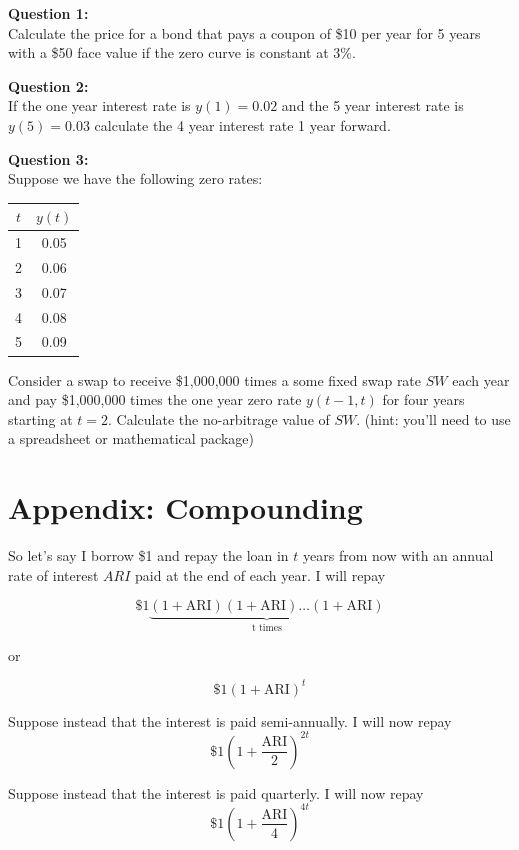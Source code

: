 \textbf{Question 1:}\\
Calculate the price for a bond that pays a coupon of \$10 per year for 5 years with a \$50 face value if the zero curve is constant at 3\%.

\textbf{Question 2:}\\
If the one year interest rate is $y(1) = 0.02$ and the 5 year interest rate is $y(5) = 0.03$ calculate the 4 year interest rate 1 year forward.

\textbf{Question 3:}\\
Suppose we have the following zero rates:\\
\begin{center}
\begin{tabular}{|c|c|}
  \hline
  $t$ & $y(t)$ \\
  \hline
  1&0.05 \\
  2&0.06 \\
  3&0.07 \\
  4&0.08 \\
  5&0.09\\
  \hline
\end{tabular}
\end{center}


Consider a swap to receive \$1,000,000 times a some fixed swap rate $SW$ each year and pay \$1,000,000 times the one year zero rate $y(t-1,t)$ for four years starting at $t=2$. Calculate the no-arbitrage value of $SW$. (hint: you'll need to use a spreadsheet or mathematical package)



\section*{Appendix: Compounding}


So let's say I borrow \$1 and repay the loan in $t$ years from now with an annual rate of interest $ARI$ paid at the end of each year. I will repay

\[ \$1\underbrace{\left(1+\mbox{ARI}\right)\left(1+\mbox{ARI}\right)\ldots\left(1+\mbox{ARI}\right)}_{\mbox{t times}} \]


or

 \[\$1\left(1+\mbox{ARI}\right)^t \]

Suppose instead that the interest is paid semi-annually. I will now repay \[\$1\left(1+\frac{\mbox{ARI}}{2}\right)^{2t} \]

Suppose instead that the interest is paid quarterly. I will now repay \[\$1\left(1+\frac{\mbox{ARI}}{4}\right)^{4t} \]

